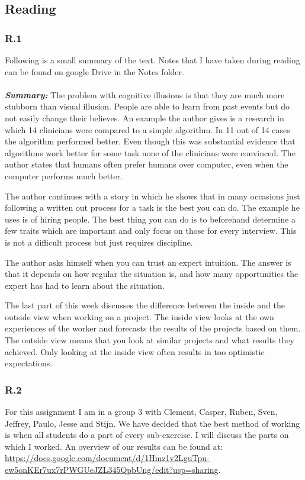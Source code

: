 \documentclass[]{article}
\begin{document}
\subsection*{Reading} 

\subsubsection*{R.1} 
Following is a small summary of the text. Notes that I have taken during reading 
can be found on google Drive in the Notes folder.\\\\
\textbf{\textit{Summary:}} 
The problem with cognitive illusions is that they are much more stubborn than 
visual illusion. People are able to learn from past events but do not easily 
change their believes. An example the author gives is a research in which 
14 clinicians were compared to a simple algorithm. In 11 out of 14 cases the 
algorithm performed better. Even though this was substantial evidence that 
algorithms work better for some task none of the clinicians were convinced. 
The author states that humans often prefer humans over computer, even when 
the computer performs much better.  

The author continues with a story in which he shows that in many occasions just 
following a written out process for a task is the best you can do. The example 
he uses is of hiring people. The best thing you can do is to beforehand determine 
a few traits which are important and only focus on those for every interview. 
This is not a difficult process but just requires discipline.

The author asks himself when you can trust an expert intuition. The answer is 
that it depends on how regular the situation is, and how many opportunities the 
expert has had to learn about the situation.

The last part of this week discusses the difference between the inside and the 
outside view when working on a project. The inside view looks at the own 
experiences of the worker and forecasts the results of the projects based on 
them. The outside view means that you look at similar projects and what results 
they achieved. Only looking at the inside view often results in too optimistic
expectations.

\subsubsection*{R.2}
For this assignment I am in a group 3 with Clement, Casper, Ruben, Sven, 
Jeffrey, Paulo, Jesse and Stijn.
We have decided that the best method of working is when all students do a part 
of every sub-exercise. I will discuss the parts on which I worked. 
An overview of our results can be found at: 
\url{https://docs.google.com/document/d/1Hmz1v2LguTpu-ew5onKEr7ux7rPWGUeJZL345QpbUng/edit?usp=sharing}.
\end{document}
